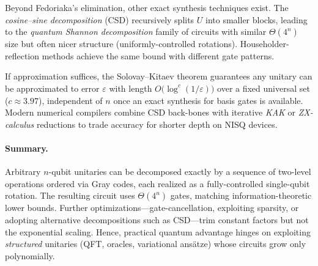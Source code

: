 Beyond Fedoriaka’s elimination, other exact synthesis techniques exist. The \emph{cosine–sine decomposition} (CSD) recursively splits $U$ into smaller blocks, leading to the \emph{quantum Shannon decomposition} family of circuits with similar $\Theta(4^{n})$ size but often nicer structure (uniformly-controlled rotations).\cite{Miller2006csd} Householder-reflection methods achieve the same bound with different gate patterns.\cite{Shende2006synthesis}

If approximation suffices, the Solovay–Kitaev theorem guarantees any unitary can be approximated to error $\varepsilon$ with length $O\!\bigl(\log^{c}(1/\varepsilon)\bigr)$ over a fixed universal set ($c\!\approx\!3.97$), independent of $n$ once an exact synthesis for basis gates is available.\cite{Dawson2005solovay} Modern numerical compilers combine CSD back-bones with iterative \emph{KAK} or \emph{ZX-calculus} reductions to trade accuracy for shorter depth on NISQ devices.\cite{Heyfron2018zx}

\paragraph{Summary.}  
Arbitrary $n$-qubit unitaries can be decomposed exactly by a sequence of two-level operations ordered via Gray codes, each realized as a fully-controlled single-qubit rotation.\cite{fedoriaka2025decomposition} The resulting circuit uses $\Theta(4^{n})$ gates, matching information-theoretic lower bounds.\cite{Shende2006synthesis} Further optimizations—gate-cancellation, exploiting sparsity, or adopting alternative decompositions such as CSD—trim constant factors but not the exponential scaling. Hence, practical quantum advantage hinges on exploiting \emph{structured} unitaries (QFT, oracles, variational ansätze) whose circuits grow only polynomially.\cite{Preskill2018nisq}
